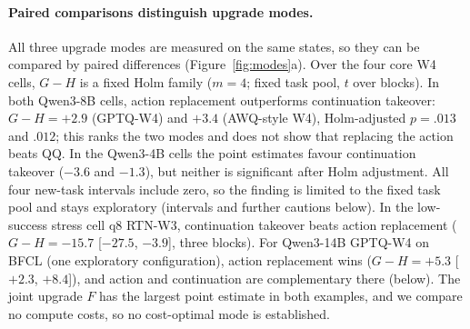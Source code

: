 \paragraph{Paired comparisons distinguish upgrade modes.} All three upgrade modes are measured on the same states, so they can be compared by paired differences (Figure~\ref{fig:modes}a). Over the four core W4 cells, $G-H$ is a fixed Holm family ($m=4$; fixed task pool, $t$ over blocks). In both Qwen3-8B cells, action replacement outperforms continuation takeover: $G-H=+2.9$ (GPTQ-W4) and $+3.4$\pp{} (AWQ-style W4), Holm-adjusted $p=.013$ and $.012$; this ranks the two modes and does not show that replacing the action beats QQ. In the Qwen3-4B cells the point estimates favour continuation takeover ($-3.6$ and $-1.3$\pp{}), but neither is significant after Holm adjustment. All four new-task intervals include zero, so the finding is limited to the fixed task pool and stays exploratory (intervals and further cautions below). %
In the low-success stress cell q8 RTN-W3, continuation takeover beats action replacement ($G-H=-15.7$ [$-27.5$, $-3.9$]\pp{}, three blocks). %
For Qwen3-14B GPTQ-W4 on BFCL (one exploratory configuration), action replacement wins ($G-H=+5.3$ [$+2.3$, $+8.4$]\pp{}), and action and continuation are complementary there (below). %
The joint upgrade $F$ has the largest point estimate in both examples, and we compare no compute costs, so no cost-optimal mode is established.

